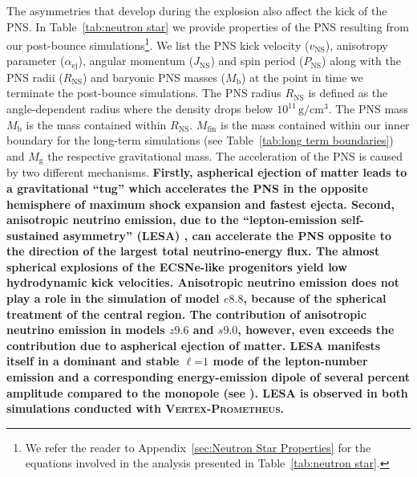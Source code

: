 \documentclass[fleqn,usenatbib]{mnras}
\newcommand{\vertexprom}{\textsc{Vertex-Prometheus}\xspace}
\newcommand{\rns}{\ensuremath{R_{\mathrm{NS}}}\xspace}
\begin{document}
The asymmetries that develop during the explosion also affect the kick of the PNS.
In Table~\ref{tab:neutron star} we provide properties of the PNS resulting from our post-bounce simulations\footnote{We refer the reader to Appendix~\ref{sec:Neutron Star Properties} for the equations involved in the analysis presented in Table~\ref{tab:neutron star}.}. We list the PNS kick velocity ($v_{\mathrm{NS}}$), anisotropy parameter ($\alpha_{\mathrm{ej}}$), angular momentum ($J_{\mathrm{NS}}$) and spin period ($P_{\mathrm{NS}}$) along with the PNS radii (\rns) and baryonic PNS masses ($M_{\mathrm{b}}$) at the point in time we terminate the post-bounce simulations. The PNS radius $\rns$ is defined as the angle-dependent radius where the density drops below $10^{11}\,\mathrm{g/cm^3}$. The PNS mass $M_{\mathrm{b}}$ is the mass contained within $\rns$. $M_{\mathrm{fin}}$ is the mass contained within our inner boundary for the long-term simulations (see Table~\ref{tab:long term boundaries}) and $M_{\mathrm{g}}$ the respective gravitational mass.
The acceleration of the PNS is caused by two different mechanisms.
\textbf{Firstly, aspherical ejection of matter leads to a gravitational ``tug'' which accelerates the PNS in the opposite hemisphere of maximum shock expansion and fastest ejecta. Second, anisotropic neutrino emission, due to the ``lepton-emission self-sustained asymmetry'' (LESA) \citep{Tamborra2014}, can accelerate the PNS opposite to the direction of the largest total neutrino-energy flux.
The almost spherical explosions of the ECSNe-like progenitors yield low hydrodynamic kick velocities. Anisotropic neutrino emission does not play a role in the simulation of model $e8.8$, because of the spherical treatment of the central region. The contribution of anisotropic neutrino emission in models $z9.6$ and $s9.0$, however, even exceeds the contribution due to aspherical ejection of matter. LESA manifests itself in a dominant and stable $\ell\mathord{=}1$ mode of the lepton-number emission and a corresponding energy-emission dipole of several percent amplitude compared to the monopole (see \citealt{Tamborra2014}). LESA is observed in both simulations conducted with \vertexprom. }
\end{document}
